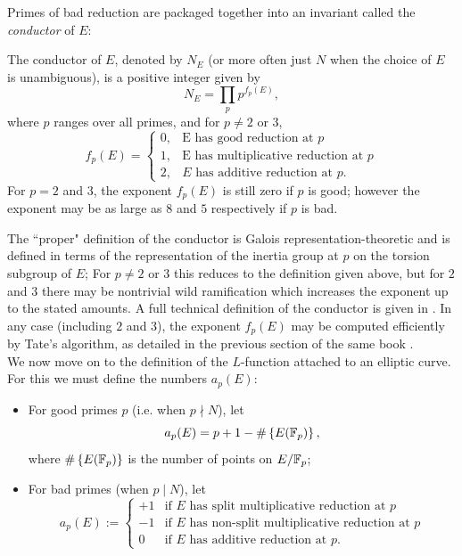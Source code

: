 \documentclass[10pt]{article}
\newcommand{\EFp}{E(\Fp)}
\begin{document}
Primes of bad reduction are packaged together into an invariant called the {\it conductor} of $E$:
\begin{definition}
The conductor of $E$, denoted by $N_E$ (or more often just $N$ when the choice of $E$ is unambiguous), is a positive integer given by
\begin{equation}
N_E = \prod_{p} p^{f_p(E)},
\end{equation}
where $p$ ranges over all primes, and for $p \ne 2$ or $3$,
\begin{equation}
f_p(E) = \begin{cases} 0, & \text{E has good reduction at $p$} \\ 1, & \text{E has multiplicative reduction at $p$} \\ 2, & \text{$E$ has additive reduction at $p$.}\end{cases}
\end{equation}
For $p=2$ and $3$, the exponent $f_p(E)$ is still zero if $p$ is good; however the exponent may be as large as $8$ and $5$ respectively if $p$ is bad.
\end{definition}
The ``proper" definition of the conductor is Galois representation-theoretic and is defined in terms of the representation of the inertia group at $p$ on the torsion subgroup of $E$; For $p\ne 2$ or $3$ this reduces to the definition given above, but for $2$ and $3$ there may be nontrivial wild ramification which increases the exponent up to the stated amounts. A full technical definition of the conductor is given in \cite[pp. 379-396]{Sil-1994}. In any case (including $2$ and $3$), the exponent $f_p(E)$ may be computed efficiently by Tate's algorithm, as detailed in the previous section of the same book \cite[pp. 361-379]{Sil-1994}. \\

We now move on to the definition of the $L$-function attached to an elliptic curve. For this we must define the numbers $a_p(E)$:
\begin{definition}\label{def:a_p} \mbox{}
\begin{itemize}
\item For good primes $p$ (i.e. when $p \nmid N$), let
\begin{equation}
a_p(E) = p+1-\#\set{\EFp},
\end{equation}
where $\#\set{\EFp}$ is the number of points on $E/\mathbb{F}_p$;
\item For bad primes (when $p \mid N$), let
\begin{equation}
a_p(E) := \begin{cases}
+1 & \text{if $E$ has split multiplicative reduction at $p$} \\
-1 & \text{if $E$ has non-split multiplicative reduction at $p$} \\
0 & \text{if $E$ has additive reduction at $p$.}
\end{cases}
\end{equation}
\end{itemize}
\end{definition}
\end{document}
